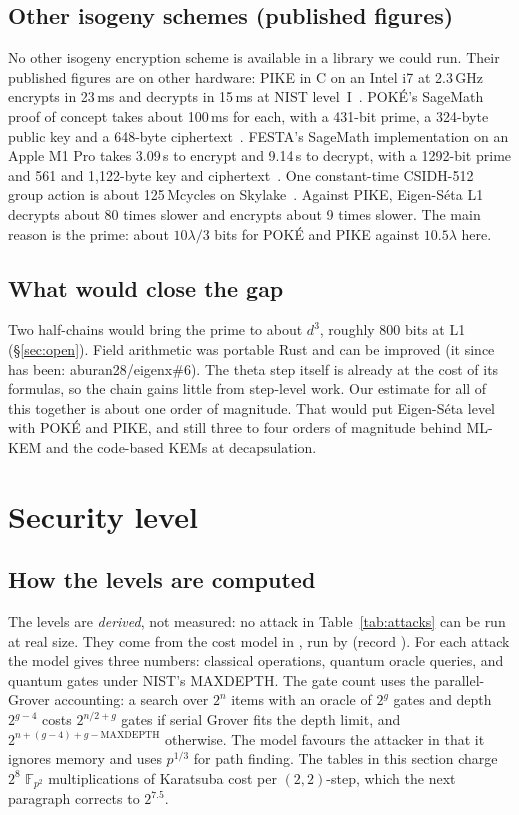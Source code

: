 \documentclass[11pt,a4paper]{article}
\newcommand{\F}{\mathbb{F}}
\begin{document}
\subsection{Other isogeny schemes (published figures)}
No other isogeny encryption scheme is available in a library we could run.
Their published figures are on other hardware: PIKE in C on an Intel i7 at
2.3\,GHz encrypts in 23\,ms and decrypts in 15\,ms at NIST level~I~\cite{PIKE}.
POKÉ's SageMath proof of concept takes about 100\,ms for each, with a
431-bit prime, a 324-byte public key and a 648-byte ciphertext~\cite{POKE}.
FESTA's SageMath implementation on an Apple M1 Pro takes 3.09\,s to encrypt
and 9.14\,s to decrypt, with a 1292-bit prime and 561 and 1,122-byte key and
ciphertext~\cite{BMP23}. One constant-time CSIDH-512 group action is about
125\,Mcycles on Skylake~\cite{CTIDH}. Against PIKE, Eigen-S\'eta L1 decrypts
about 80 times slower and encrypts about 9 times slower. The main reason is
the prime: about $10\lambda/3$ bits for POKÉ and PIKE against $10.5\lambda$
here.

\subsection{What would close the gap}
Two half-chains would bring the prime to about $d^3$, roughly 800 bits at L1
(\S\ref{sec:open}). Field arithmetic was portable Rust and can be improved (it since has
been: aburan28/eigenx\#6). The theta step itself is already at the cost of
its formulas, so the chain gains little from step-level work. Our estimate for all of this together is about one order of
magnitude. That would put Eigen-S\'eta level with POKÉ and PIKE, and still
three to four orders of magnitude behind ML-KEM and the code-based KEMs at
decapsulation.

\section{Security level}\label{sec:security}

\subsection{How the levels are computed}
The levels are \emph{derived}, not measured: no attack in
Table~\ref{tab:attacks} can be run at real size. They come from the cost
model in , run by
 (record
).
For each attack the model gives three numbers: classical operations, quantum
oracle queries, and quantum gates under NIST's MAXDEPTH. The gate count uses
the parallel-Grover accounting: a search over $2^n$ items with an oracle of
$2^g$ gates and depth $2^{g-4}$ costs $2^{n/2+g}$ gates if serial Grover fits
the depth limit, and $2^{n+(g-4)+g-\mathrm{MAXDEPTH}}$ otherwise. The model
favours the attacker in that it ignores memory and uses $p^{1/3}$ for path
finding. The tables in this section charge $2^8$ $\F_{p^2}$ multiplications
of Karatsuba cost per $(2,2)$-step, which the next paragraph corrects to
$2^{7.5}$.
\end{document}
